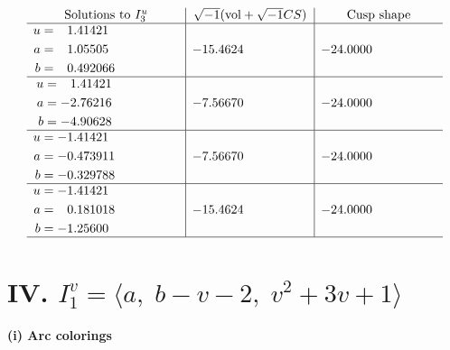 \documentclass[1p]{elsarticle_modified}
\theoremstyle{definition}
\newcommand{\I}{\sqrt{-1}}
\begin{document}
$$\begin{array}{c|c|c}  
\text{Solutions to }I^u_{3}& \I (\text{vol} + \sqrt{-1}CS) & \text{Cusp shape}\\
 \hline 
\begin{aligned}
u &= \phantom{-}1.41421\phantom{ +0.000000I} \\
a &= \phantom{-}1.05505\phantom{ +0.000000I} \\
b &= \phantom{-}0.492066\phantom{ +0.000000I}\end{aligned}
 & -15.4624\phantom{ +0.000000I} & -24.0000\phantom{ +0.000000I} \\ \hline\begin{aligned}
u &= \phantom{-}1.41421\phantom{ +0.000000I} \\
a &= -2.76216\phantom{ +0.000000I} \\
b &= -4.90628\phantom{ +0.000000I}\end{aligned}
 & -7.56670\phantom{ +0.000000I} & -24.0000\phantom{ +0.000000I} \\ \hline\begin{aligned}
u &= -1.41421\phantom{ +0.000000I} \\
a &= -0.473911\phantom{ +0.000000I} \\
b &= -0.329788\phantom{ +0.000000I}\end{aligned}
 & -7.56670\phantom{ +0.000000I} & -24.0000\phantom{ +0.000000I} \\ \hline\begin{aligned}
u &= -1.41421\phantom{ +0.000000I} \\
a &= \phantom{-}0.181018\phantom{ +0.000000I} \\
b &= -1.25600\phantom{ +0.000000I}\end{aligned}
 & -15.4624\phantom{ +0.000000I} & -24.0000\phantom{ +0.000000I}\\
 \hline 
 \end{array}$$\newpage\newpage\renewcommand{\arraystretch}{1}
\centering \section*{IV. $I^v_{1}= \langle a,\;b- v-2,\;v^2+3 v+1 \rangle$}
\flushleft \textbf{(i) Arc colorings}\\
\end{document}
